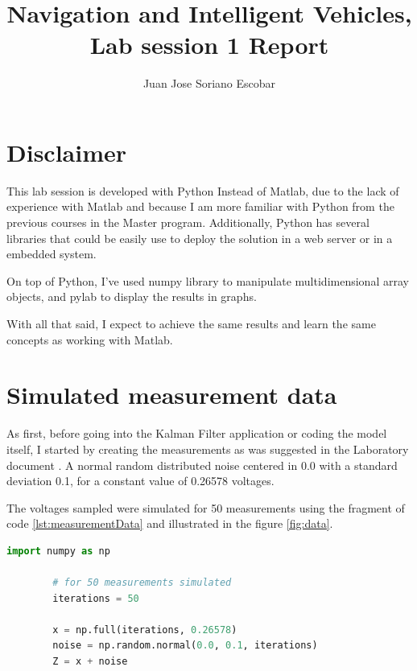 \documentclass{article}
\begin{document}
    \title{Navigation and Intelligent Vehicles, Lab session 1 Report}
    \author{Juan Jose Soriano Escobar}
    \maketitle
    \newpage

    \section*{Disclaimer}

    This lab session is developed with Python Instead of Matlab, due to the lack of experience with Matlab
    and because I am more familiar with Python from the previous courses in the Master program. Additionally,
    Python has several libraries that could be easily use to deploy the solution in a web server or in a embedded system.

    On top of Python, I've used numpy library to manipulate multidimensional array objects, and pylab to display the results in graphs. 

    With all that said, I expect to achieve the same results and learn the same concepts as working with Matlab.

    \section{Simulated measurement data}
    

    As  first, before going into the Kalman Filter application  or coding the model itself, I started by creating the measurements
    as was suggested in the Laboratory document \cite{LabManual}. A normal random distributed noise centered in 0.0 with a standard deviation 0.1, 
    for a constant value of 0.26578 voltages.

    The voltages sampled were simulated for 50 measurements using the fragment of code \ref{lst:measurementData} and illustrated in the figure \ref{fig:data}.

    \begin{lstlisting}[language=Python, caption= Measurement data simulation, label={lst:measurementData}]
        import numpy as np

        # for 50 measurements simulated
        iterations = 50

        x = np.full(iterations, 0.26578)
        noise = np.random.normal(0.0, 0.1, iterations) 
        Z = x + noise
    \end{lstlisting}
    
\end{document}
